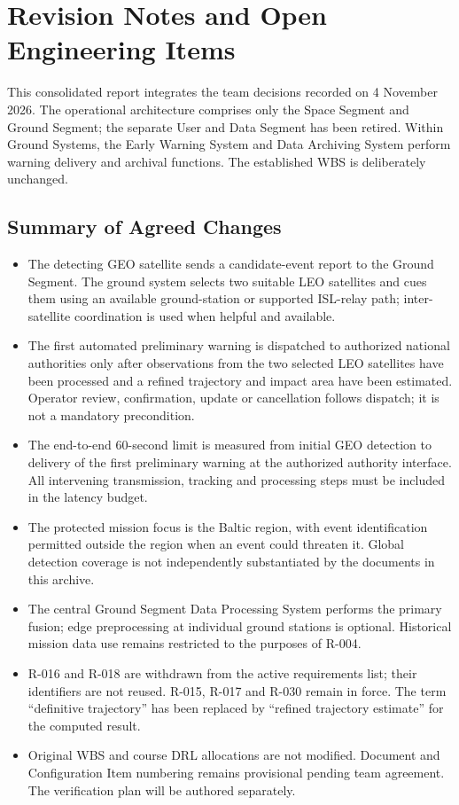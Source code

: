 
\newpage
\section{Revision Notes and Open Engineering Items}
This consolidated report integrates the team decisions recorded on 4 November 2026. The operational architecture comprises only the Space Segment and Ground Segment; the separate User and Data Segment has been retired. Within Ground Systems, the Early Warning System and Data Archiving System perform warning delivery and archival functions. The established WBS is deliberately unchanged.

\subsection{Summary of Agreed Changes}
\begin{itemize}
  \item The detecting GEO satellite sends a candidate-event report to the Ground Segment. The ground system selects two suitable LEO satellites and cues them using an available ground-station or supported ISL-relay path; inter-satellite coordination is used when helpful and available.
  \item The first automated preliminary warning is dispatched to authorized national authorities only after observations from the two selected LEO satellites have been processed and a refined trajectory and impact area have been estimated. Operator review, confirmation, update or cancellation follows dispatch; it is not a mandatory precondition.
  \item The end-to-end 60-second limit is measured from initial GEO detection to delivery of the first preliminary warning at the authorized authority interface. All intervening transmission, tracking and processing steps must be included in the latency budget.
  \item The protected mission focus is the Baltic region, with event identification permitted outside the region when an event could threaten it. Global detection coverage is not independently substantiated by the documents in this archive.
  \item The central Ground Segment Data Processing System performs the primary fusion; edge preprocessing at individual ground stations is optional. Historical mission data use remains restricted to the purposes of R-004.
  \item R-016 and R-018 are withdrawn from the active requirements list; their identifiers are not reused. R-015, R-017 and R-030 remain in force. The term ``definitive trajectory'' has been replaced by ``refined trajectory estimate'' for the computed result.
  \item Original WBS and course DRL allocations are not modified. Document and Configuration Item numbering remains provisional pending team agreement. The verification plan will be authored separately.
\end{itemize}

